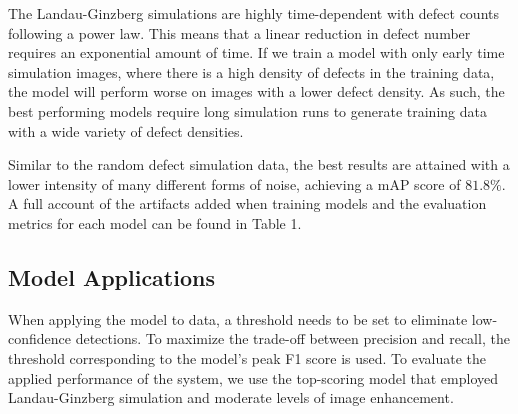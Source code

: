 \documentclass[twoside,twocolumn,9pt]{article}
\begin{document}
\begin{table}[h!]
\end{table}

The Landau-Ginzberg simulations are highly time-dependent with defect counts following a power law. This means that a linear reduction in defect number requires an exponential amount of time. If we train a model with only early time simulation images, where there is a high density of defects in the training data, the model will perform worse on images with a lower defect density. As such, the best performing models require long simulation runs to generate training data with a wide variety of defect densities. 

Similar to the random defect simulation data, the best results are attained with a lower intensity of many different forms of noise, achieving a mAP score of $81.8\%$. A full account of the artifacts added when training models and the evaluation metrics for each model can be found in Table 1.

\subsection{Model Applications}

When applying the model to data, a threshold needs to be set to eliminate low-confidence detections. To maximize the trade-off between precision and recall, the threshold corresponding to the model's peak F1 score is used. To evaluate the applied performance of the system, we use the top-scoring model that employed Landau-Ginzberg simulation and moderate levels of image enhancement.%
\end{document}
